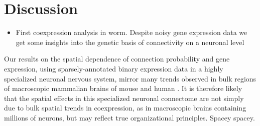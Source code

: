\documentclass[10pt,letterpaper]{article}
\begin{document}
\section*{Discussion}
\begin{itemize}
    \item{First coexpression analysis in worm. Despite noisy gene expression data we get some insights into the genetic basis of connectivity on a neuronal level}
\end{itemize}

Our results on the spatial dependence of connection probability and gene expression, using sparsely-annotated binary expression data in a highly specialized neuronal nervous system, mirror many trends observed in bulk regions of macroscopic mammalian brains of mouse \cite{Fulcher:2016ck} and human \cite{Krienen:2016eq}.
It is therefore likely that the spatial effects in this specialized neuronal connectome are not simply due to bulk spatial trends in coexpression, as in macroscopic brains containing millions of neurons, but may reflect true organizational principles.
Spacey spacey.
\end{document}
